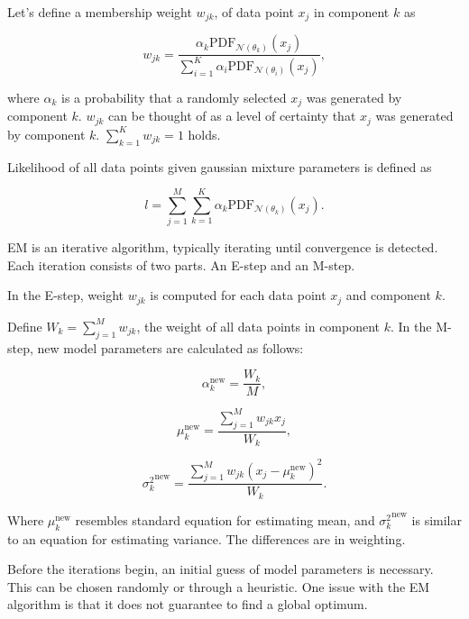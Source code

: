 \documentclass[thesis=B,english]{FITthesis}[2012/06/26]
\begin{document}
Let's define a membership weight $w_{jk}$, of data point $x_j$ in component $k$ as

\begin{equation}
w_{jk} = \frac{\alpha_k \text{PDF}_{\mathcal{N}(\theta_k)}(x_j)}{\sum_{i=1}^K \alpha_i \text{PDF}_{\mathcal{N}(\theta_i)}(x_j)},
\end{equation}

where $\alpha_k$ is a probability that a randomly selected $x_j$ was generated by component $k$. $w_{jk}$ can be thought of as a level of certainty that $x_j$ was generated by component $k$. $\sum_{k=1}^K w_{jk} = 1$ holds.

Likelihood of all data points given gaussian mixture parameters is defined as

\begin{equation} \label{eq:gaussian_mixture_likelihood}
l = \sum_{j=1}^{M} \sum_{k=1}^{K} \alpha_k \text{PDF}_{\mathcal{N}(\theta_k)}(x_j).
\end{equation}

EM is an iterative algorithm, typically iterating until convergence is detected. Each iteration consists of two parts. An E-step and an M-step.

In the E-step, weight $w_{jk}$ is computed for each data point $x_j$ and component $k$.

Define $W_k = \sum_{j=1}^{M} w_{jk}$, the weight of all data points in component $k$. In the M-step, new model parameters are calculated as follows:

\begin{equation}
\alpha_k^{\text{new}} = \frac{W_k}{M},
\end{equation}

\begin{equation}
\mu_k^{\text{new}} = \frac{\sum_{j=1}^M w_{jk} x_j}{W_k},
\end{equation}

\begin{equation}
{\sigma_k^{2}}^{\text{new}} = \frac{\sum_{j=1}^M w_{jk} (x_j-\mu_k^{\text{new}})^2}{W_k}.
\end{equation}

Where $\mu_k^{\text{new}}$ resembles standard equation for estimating mean, and 
${\sigma_k^{2}}^{\text{new}}$ is similar to an equation for estimating variance. The differences are in weighting.

Before the iterations begin, an initial guess of model parameters is necessary. This can be chosen randomly or through a heuristic. One issue with the EM algorithm is that it does not guarantee to find a global optimum.
\end{document}
